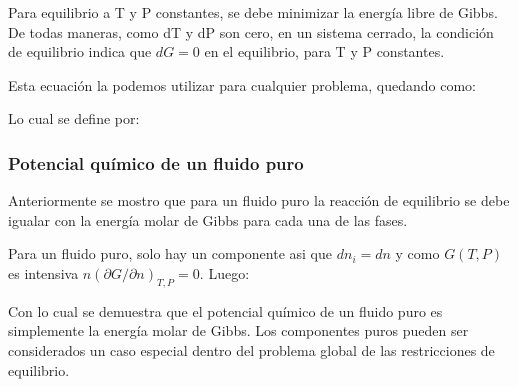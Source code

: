 Para equilibrio a T y P constantes, se debe minimizar la energía libre de Gibbs. De todas maneras, como dT y dP son cero, en un sistema cerrado, la condición de equilibrio indica que $dG=0$ en el equilibrio, para T y P constantes.

Esta ecuación la podemos utilizar para cualquier problema, quedando como:



Lo cual se define por:

\subsubsection{Potencial químico de un fluido puro}

Anteriormente se mostro que para un fluido puro la reacción de equilibrio se debe igualar con la energía molar de Gibbs para cada una de las fases.

Para un fluido puro, solo hay un componente asi que $dn_i=dn$ y como $G(T,P)$ es intensiva $n(\partial G/\partial n)_{T,P}=0$. Luego:


Con lo cual se demuestra que el potencial químico de un fluido puro es simplemente la energía molar de Gibbs. Los componentes puros pueden ser considerados un caso especial dentro del problema global de las restricciones de equilibrio.